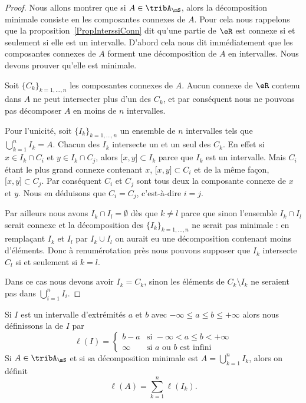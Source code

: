 \begin{proof}
    Nous allons montrer que si \( A\in\tribA_{\mS}\), alors la décomposition minimale consiste en les composantes connexes de \( A\). Pour cela nous rappelons que la proposition~\ref{PropInterssiConn} dit qu'une partie de \( \eR\) est connexe si et seulement si elle est un intervalle. D'abord cela nous dit immédiatement que les composantes connexes de \( A\) forment une décomposition de \( A\) en intervalles. Nous devons prouver qu'elle est minimale.

    Soit \( \{ C_k \}_{k=1,\ldots, n}\) les composantes connexes de \( A\). Aucun connexe de \( \eR\) contenu dans \( A\) ne peut intersecter plus d'un des \( C_k\), et par conséquent nous ne pouvons pas décomposer \( A\) en moins de \( n\) intervalles.

    Pour l'unicité, soit \( \{ I_k \}_{k=1,\ldots, n}\) un ensemble de \( n\) intervalles tels que \( \bigcup_{k=1}^nI_k=A\). Chacun des \( I_k\) intersecte un et un seul des \( C_k\). En effet si \( x\in I_k\cap C_i\) et \( y\in I_k\cap C_j\), alors \( \mathopen[ x , y \mathclose]\subset I_k\) parce que \( I_k\) est un intervalle. Mais \( C_i\) étant le plus grand connexe contenant \( x\), \( \mathopen[ x , y \mathclose]\subset C_i\) et de la même façon, \( \mathopen[ x , y \mathclose]\subset C_j\). Par conséquent \( C_i\) et \( C_j\) sont tous deux la composante connexe de \( x\) et \( y\). Nous en déduisons que \( C_i=C_j\), c'est-à-dire \( i=j\).

    Par ailleurs nous avons \( I_k\cap I_l=\emptyset\) dès que \( k\neq l\) parce que sinon l'ensemble \( I_k\cap I_l\) serait connexe et la décomposition des \( \{ I_k \}_{k=1,\ldots, n} \) ne serait pas minimale : en remplaçant \( I_k\) et \( I_l\) par \( I_k\cup I_l\) on aurait eu une décomposition contenant moins d'éléments. Donc à renumérotation près nous pouvons supposer que \( I_k\) intersecte \( C_l\) si et seulement si \( k=l\).

    Dans ce cas nous devons avoir \( I_k=C_k\), sinon les éléments de \( C_k\setminus I_k\) ne seraient pas dans \( \bigcup_{i=1}^nI_i\).
\end{proof}

\begin{definition}
    Si \( I\) est un intervalle d'extrémités \( a\) et \( b\) avec \( -\infty\leq a\leq b\leq +\infty\) alors nous définissons la  de \( I\) par
    \begin{equation}
        \ell(I)=\begin{cases}
            b-a    &   \text{si } -\infty<a\leq b< +\infty\\
            \infty    &    \text{si } a\text{ ou } b\text{ est infini}
        \end{cases}
    \end{equation}
    Si \( A\in\tribA_{\mS}\) et si sa décomposition minimale est \( A=\bigcup_{k=1}^nI_k\), alors on définit
    \begin{equation}
        \ell(A)=\sum_{k=1}^n\ell(I_k).
    \end{equation}
\end{definition}

